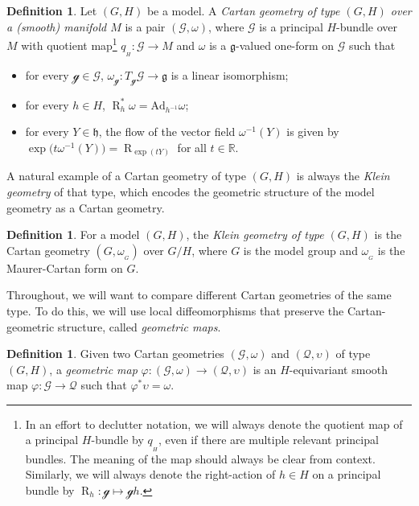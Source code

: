 \documentclass[10pt,a4paper]{amsart}
\numberwithin{equation}{section}
\theoremstyle{definition}
\newtheorem{Definition}[Theorem]{Definition}
\newcommand{\Ad}{\mathrm{Ad}}
\newcommand{\MC}[1]{\omega_{{}_{#1}}}
\newcommand{\Rt}[1]{\operatorname{R}_{#1}}
\begin{document}
\begin{Definition}Let $(G,H)$ be a model. A \emph{Cartan geometry of type $(G,H)$ over a (smooth) manifold $M$} is a pair $(\mathscr{G},\omega)$, where $\mathscr{G}$ is a principal $H$-bundle over $M$ with quotient map\footnote{In an effort to declutter notation, we will always denote the quotient map of a principal $H$-bundle by $q_{{}_H}$, even if there are multiple relevant principal bundles. The meaning of the map should always be clear from context. Similarly, we will always denote the right-action of $h\in H$ on a principal bundle by $\Rt{h}\colon \mathscr{g}\mapsto\mathscr{g}h$.} $q_{{}_H}\colon \mathscr{G}\to M$ and $\omega$ is a $\mathfrak{g}$-valued one-form on $\mathscr{G}$ such that
\begin{itemize}\itemsep=0pt
\item for every $\mathscr{g}\in\mathscr{G}$, $\omega_\mathscr{g} \colon T_\mathscr{g}\mathscr{G}\to\mathfrak{g}$ is a linear isomorphism;
\item for every $h\in H$, $\Rt{h}^*\omega=\Ad_{h^{-1}}\omega$;
\item for every $Y\in\mathfrak{h}$, the flow of the vector field $\omega^{-1}(Y)$ is given by $\exp\bigl(t\omega^{-1}(Y)\bigr)=\Rt{\exp(tY)}$ for all $t\in\mathbb{R}$.\end{itemize}\end{Definition}

A natural example of a Cartan geometry of type $(G,H)$ is always the \emph{Klein geometry} of that type, which encodes the geometric structure of the model geometry as a Cartan geometry.

\begin{Definition}For a model $(G,H)$, the \emph{Klein geometry of type $(G,H)$} is the Cartan geometry $(G,\MC{G})$ over $G/H$, where $G$ is the model group and $\MC{G}$ is the Maurer-Cartan form on $G$.\end{Definition}

Throughout, we will want to compare different Cartan geometries of the same type. To do this, we will use local diffeomorphisms that preserve the Cartan-geometric structure, called \emph{geometric maps}.

\begin{Definition}Given two Cartan geometries $(\mathscr{G},\omega)$ and $(\mathscr{Q},\upsilon)$ of type $(G,H)$, a \emph{geometric map} $\varphi\colon (\mathscr{G},\omega)\to (\mathscr{Q},\upsilon)$ is an $H$-equivariant smooth map $\varphi\colon \mathscr{G}\to\mathscr{Q}$ such that $\varphi^*\upsilon=\omega$.\end{Definition}
\end{document}
